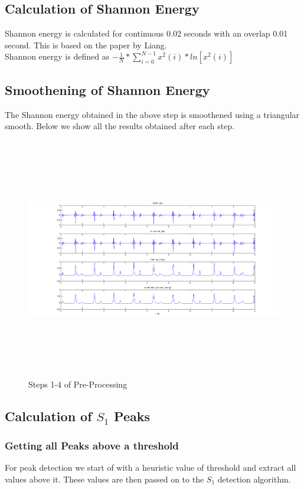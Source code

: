 \documentclass{article}
\begin{document}
\subsection{Calculation of Shannon Energy}
Shannon energy is calculated for continuous 0.02 seconds with an overlap 0.01 second. This is based on the paper by Liang. \\
Shannon energy is defined as $-\frac{1}{N} * \sum_{i=0}^{N-1}{x^2(i) * ln[x^2(i)]}$

\subsection{Smoothening of Shannon Energy}
The Shannon energy obtained in the above step is smoothened using a triangular smooth. Below we show all the results obtained after each step.
\begin{center}
\begin{figure}
\includegraphics[width=500pt, height=300pt]{ATraining_8_Steps1to4.png}
\caption{Steps 1-4 of Pre-Processing}
\end{figure}
\end{center}
\newpage
\subsection{Calculation of $S_1$ Peaks}
\subsubsection{Getting all Peaks above a threshold}
For peak detection we start of with a heuristic value of threshold and extract all values above it. These values are then passed on to the $S_1$ detection algorithm. 
\end{document}
